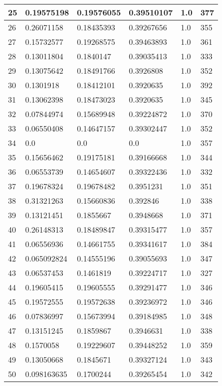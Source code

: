 \begin{longtable}{|l|l|l|l|l|l|}
25 & 0.19575198 & 0.19576055 & 0.39510107 & 1.0 & 377 \\ \hline 
26 & 0.26071158 & 0.18435393 & 0.39267656 & 1.0 & 355 \\ \hline 
27 & 0.15732577 & 0.19268575 & 0.39463893 & 1.0 & 361 \\ \hline 
28 & 0.13011804 & 0.1840147 & 0.39035413 & 1.0 & 333 \\ \hline 
29 & 0.13075642 & 0.18491766 & 0.3926808 & 1.0 & 352 \\ \hline 
30 & 0.1301918 & 0.18412101 & 0.3920635 & 1.0 & 392 \\ \hline 
31 & 0.13062398 & 0.18473023 & 0.3920635 & 1.0 & 345 \\ \hline 
32 & 0.07844974 & 0.15689948 & 0.39224872 & 1.0 & 370 \\ \hline 
33 & 0.06550408 & 0.14647157 & 0.39302447 & 1.0 & 352 \\ \hline 
34 & 0.0 & 0.0 & 0.0 & 1.0 & 357 \\ \hline 
35 & 0.15656462 & 0.19175181 & 0.39166668 & 1.0 & 344 \\ \hline 
36 & 0.06553739 & 0.14654607 & 0.39322436 & 1.0 & 332 \\ \hline 
37 & 0.19678324 & 0.19678482 & 0.3951231 & 1.0 & 351 \\ \hline 
38 & 0.31321263 & 0.15660836 & 0.392846 & 1.0 & 338 \\ \hline 
39 & 0.13121451 & 0.1855667 & 0.3948668 & 1.0 & 371 \\ \hline 
40 & 0.26148313 & 0.18489847 & 0.39315477 & 1.0 & 357 \\ \hline 
41 & 0.06556936 & 0.14661755 & 0.39341617 & 1.0 & 384 \\ \hline 
42 & 0.065092824 & 0.14555196 & 0.39055693 & 1.0 & 347 \\ \hline 
43 & 0.06537453 & 0.1461819 & 0.39224717 & 1.0 & 327 \\ \hline 
44 & 0.19605415 & 0.19605555 & 0.39291477 & 1.0 & 346 \\ \hline 
45 & 0.19572555 & 0.19572638 & 0.39236972 & 1.0 & 346 \\ \hline 
46 & 0.07836997 & 0.15673994 & 0.39184985 & 1.0 & 348 \\ \hline 
47 & 0.13151245 & 0.1859867 & 0.3946631 & 1.0 & 338 \\ \hline 
48 & 0.1570058 & 0.19229607 & 0.39448252 & 1.0 & 359 \\ \hline 
49 & 0.13050668 & 0.1845671 & 0.39327124 & 1.0 & 343 \\ \hline 
50 & 0.098163635 & 0.1700244 & 0.39265454 & 1.0 & 342 \\ \hline 
\end{longtable}